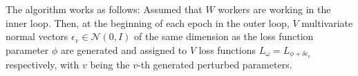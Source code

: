 \par
The algorithm works as follows: Assumed that $\textit{W}$ workers are working in the inner loop. Then, at the beginning of each epoch in the outer loop, $\textit{V}$ multivariate normal vectors $\epsilon_v \in \mathcal{N}(0,I)$ of the same dimension as the loss function parameter $\phi$ are generated and assigned to $\textit{V}$ loss functions $L_\omega = L_{\phi+\delta\epsilon_v}$ respectively, with $\textit{v}$ being the $\textit{v}$-th generated perturbed parameters. 
